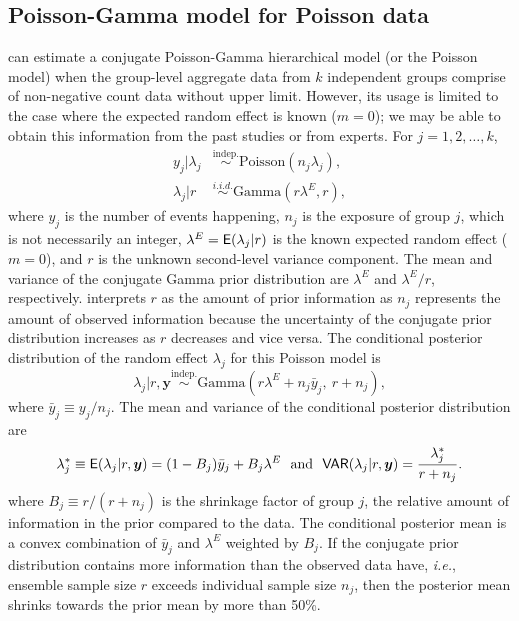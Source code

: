 \documentclass[article]{jss}
\begin{document}
\subsection[Poisson-Gamma]{Poisson-Gamma model for Poisson data}\label{poissonsubsec}
 can estimate a conjugate Poisson-Gamma hierarchical model (or the Poisson model) when the group-level aggregate data from $k$ independent  groups comprise of non-negative count data without upper limit. However, its usage is limited to the case where the expected random effect is known ($m=0$); we may be able to obtain this information from the past studies or from experts. For $j=1, 2, \ldots, k$, 
\begin{align}
y_j\vert \lambda_j &\stackrel{\textrm{indep.}}{\sim}  \textrm{Poisson}(n_{j}\lambda_{j}),\\
\lambda_{j}\vert r &\stackrel{i.i.d.}{\sim} \textrm{Gamma}(r\lambda^E, r),
\end{align}
where $y_j$ is the number of events happening, $n_{j}$ is the exposure of group $j$, which is not necessarily an integer, $\lambda^E=\mathsf{E}(\lambda_j\vert r)$ is the known expected random effect ($m=0$), and $r$ is the unknown second-level variance component. The mean and variance of the conjugate Gamma prior distribution are $\lambda^E$ and $\lambda^E/r$, respectively.  \cite{albert1988computational} interprets $r$ as the amount of prior information as $n_{j}$ represents the amount of observed information because the uncertainty of the conjugate prior distribution increases as $r$ decreases and vice versa. The conditional posterior distribution of the random effect $\lambda_j$ for this Poisson model is
\begin{equation} \label{gammapost}
\lambda_j\vert r, \boldsymbol{y} \stackrel{\textrm{indep.}}{\sim}\textrm{Gamma}(r\lambda^E + n_j\bar{y}_{j},~ r + n_j),
\end{equation}  
where $\bar{y}_j\equiv y_j/n_j$. The mean and variance of the conditional posterior distribution are
\begin{equation}\label{gammapost_mean_var}
\lambda^\ast_j\equiv \mathsf{E}(\lambda_j\vert r, \boldsymbol{y} )=(1-B_{j})\bar{y}_{j} + B_{j}\lambda^E~~\textrm{and}~~\mathsf{VAR}(\lambda_j\vert r, \boldsymbol{y})=\frac{\lambda^\ast_j}{r+n_j}.
\end{equation}
where $B_{j}\equiv r / (r+n_{j})$ is the shrinkage factor of group $j$, the relative amount of information in the prior compared to the data. The conditional posterior mean is  a convex combination of $\bar{y}_{j}$ and  $\lambda^E$ weighted by $B_j$. If the conjugate prior distribution contains more information than the observed data have, \emph{i.e.}, ensemble sample size $r$ exceeds individual sample size $n_{j}$, then the posterior mean shrinks  towards the prior mean by more than 50\%.%
\end{document}
